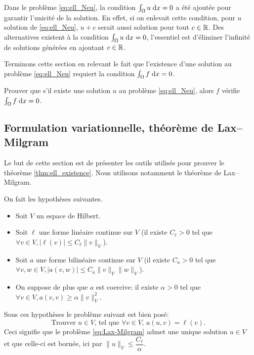 \documentclass[12pt,a4paper,twoside]{article}
\begin{document}
Dans le probl\`eme \eqref{eq:ell_Neu}, 
la condition $\int_{\Omega} u \;\mathrm{d} x = 0$ a \'et\'e ajout\'ee
pour garantir l'unicit\'e de la solution. 
En effet, si on enlevait cette condition, pour $u$ solution
de \eqref{eq:ell_Neu}, $u+c$ serait aussi solution pour tout $c\in \mathbb{R}$.
Des alternatives existent \`a la condition 
$\int_{\Omega} u \;\mathrm{d} x = 0$,
l'essentiel est d'\'eliminer l'infinit\'e de solutions g\'en\'er\'ees en
ajoutant $c\in\mathbb{R}$.

Terminons cette section en relevant le fait que l'existence d'une solution
au probl\`eme \eqref{eq:ell_Neu} requiert la condition
$\int_{\Omega} f \;\mathrm{d} x = 0$.

\begin{exercise}
  Prouver que s'il existe une solution $u$ au probl\`eme \eqref{eq:ell_Neu},
  alors $f$ v\'erifie $\int_{\Omega} f \;\mathrm{d} x = 0$.
\end{exercise}

\subsection{Formulation variationnelle, th\'eor\`eme de Lax--Milgram}
\label{subsec:LM}

Le but de cette section est de pr\'esenter les outils utilis\'es pour prouver 
le th\'eor\`eme \ref{thm:ell_existence}.
Nous utilisons notamment le th\'eor\`eme de Lax--Milgram.

\begin{theorem}
  \label{thm:Lax-Milgram}
  On fait les hypoth\`eses suivantes.
  \begin{itemize}
  \item Soit $V$ un espace de Hilbert.
  \item Soit $\ell$ une forme lin\'eaire continue sur $V$
    (il existe $C_{\ell} > 0$ tel que $\forall v \in V, |\ell(v)| \leq C_{\ell} \| v \|_{V}$).
  \item Soit $a$ une forme bilin\'eaire continue sur $V$
    (il existe $C_{a} > 0$ tel que $\forall v,w \in V, |a(v,w)| \leq C_{a} \| v \|_{V} \| w \|_{V}$).
  \item On suppose de plus que $a$ est coercive:
    il existe $\alpha > 0$ tel que $\forall v \in V, a(v,v) \geq \alpha \| v \|_{V}^2$.
  \end{itemize}
  Sous ces hypoth\`eses le probl\`eme suivant est bien pos\'e:
  \begin{equation}
    \label{eq:Lax-Milgram}
    \text{Trouver $u \in V$, tel que $\forall v \in V$, } a(u,v) = \ell(v) .
  \end{equation}
  Ceci signifie que le probl\`eme \eqref{eq:Lax-Milgram} admet une unique solution $u \in V$
  et que celle-ci est bornée, ici par $\| u \|_{V} \leq \dfrac{C_{\ell}}{\alpha}$.
\end{theorem}
\end{document}
